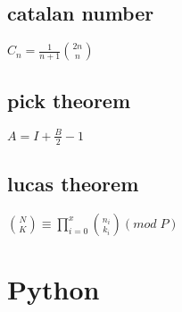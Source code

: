 \subsection{catalan number}
\mbox{\Large\(C_n = \frac{1}{n + 1} \binom{2n}{n}\)}
\subsection{pick theorem}
\mbox{\Large\(A=I+\frac{B}{2}-1\)}
\subsection{lucas theorem}
\mbox{\Large\(\binom{N}{K} \equiv \prod_{i=0}^{x}\binom{n_i}{k_i} (mod\;P)\)}
\singlespacing

\section{Python}


